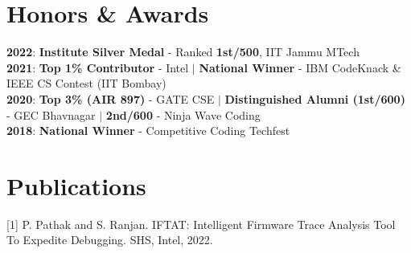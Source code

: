 \documentclass[letterpaper,10pt]{article}
\begin{document}
\section{Honors \& Awards}
 \begin{itemize}[leftmargin=0.015in, label={}]
    \small{\item{
     \textbf{2022}{: \textbf{Institute Silver Medal} - Ranked \textbf{1st/500}, IIT Jammu MTech} \\
     \textbf{2021}{: \textbf{Top 1\% Contributor} - Intel $|$ \textbf{National Winner} - IBM CodeKnack \& IEEE CS Contest (IIT Bombay)} \\
     \textbf{2020}{: \textbf{Top 3\% (AIR 897)} - GATE CSE $|$ \textbf{Distinguished Alumni (1st/600)} - GEC Bhavnagar $|$ \textbf{2nd/600} - Ninja Wave Coding} \\
     \textbf{2018}{: \textbf{National Winner} - Competitive Coding Techfest}
    }}
 \end{itemize}

\section{Publications}
 \begin{itemize}[leftmargin=0.015in, label={}]
    \small{\item{
     {[1] P. Pathak and S. Ranjan. IFTAT: Intelligent Firmware Trace Analysis Tool To Expedite Debugging. SHS, Intel, 2022.}
    }}
 \end{itemize}
\end{document}
